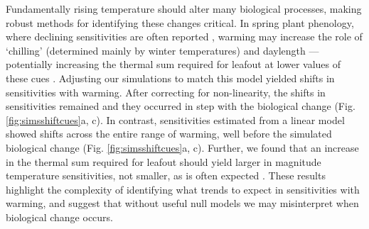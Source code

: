\documentclass[11pt,letter]{article}
\begin{document}
Fundamentally rising temperature should alter many biological processes, making robust methods for identifying these changes critical. In spring plant phenology, where declining sensitivities are often reported \citep{fu2015,piao2017,dai2019ag}, warming may increase the role of `chilling' (determined mainly by winter temperatures) and daylength \citep{Laube:2014a,zohner2016}---potentially increasing the thermal sum required for leafout at lower values of these cues \citep{Polgar2014,zohner2017}. Adjusting our simulations to match this model yielded shifts in sensitivities with warming. After correcting for non-linearity, the shifts in sensitivities remained and they occurred in step with the biological change (Fig. \ref{fig:simsshiftcues}a, c). In contrast, sensitivities estimated from a linear model showed shifts across the entire range of warming, well before the simulated biological change (Fig. \ref{fig:simsshiftcues}a, c). Further, we found that an increase in the thermal sum required for leafout should yield larger in magnitude temperature sensitivities, not smaller, as is often expected \citep[e.g.,][]{fu2015}. These results highlight the complexity of identifying what trends to expect in sensitivities with warming, and suggest that without useful null models we may misinterpret when biological change occurs.  \\ %


\end{document}
